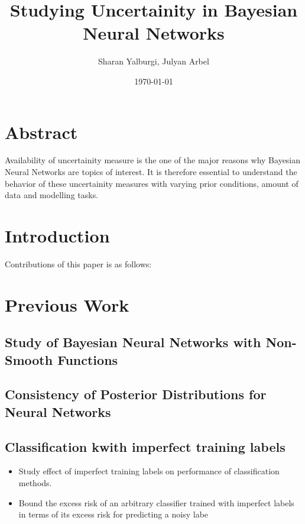 \documentclass[a4paper,twocolumn]{article}
\author{Sharan Yalburgi, Julyan Arbel}
\date{\today}
\title{Studying Uncertainity in Bayesian Neural Networks}
\begin{document}
\maketitle


\section{Abstract}
\label{sec-1}
Availability of uncertainity measure is the one of the major reasons why Bayesian Neural Networks are topics of interest. It is therefore essential to understand the behavior of these uncertainity measures with varying prior conditions, amount of data and modelling tasks.


\section{Introduction}
\label{sec-2}

Contributions of this paper is as follows:

\section{Previous Work}
\label{sec-3}

\subsection{Study of Bayesian Neural Networks with Non-Smooth Functions \cite{NNnonsmooth}}
\label{sec-3-1}

\subsection{Consistency of Posterior Distributions for Neural Networks \cite{lee2000consistency}}
\label{sec-3-2}

\subsection{Classification kwith imperfect training labels \cite{cannings2018classification}}
\label{sec-3-3}
\begin{itemize}
\item Study effect of imperfect training labels on performance of classification methods.

\item Bound the excess risk of an arbitrary classifier trained with imperfect labels in terms of its excess risk for predicting a noisy labe
\end{itemize}
\end{document}
